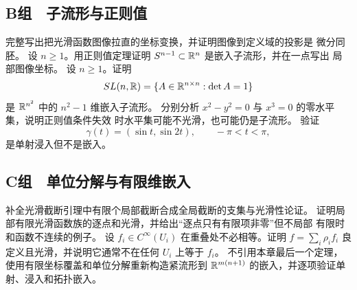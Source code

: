 \subsection*{B组　子流形与正则值}
\begin{enumerate}[label=\textbf{\thechapter.\arabic*.},resume]
 完整写出把光滑函数图像拉直的坐标变换，并证明图像到定义域的投影是
 微分同胚。
 设 $n\ge1$。用正则值定理证明 \(S^{n-1}\subset\mathbb{R}^n\) 是嵌入子流形，并在一点写出
 局部图像坐标。
 设 \(n\ge1\)。证明
 \[
 SL(n,\mathbb{R})=\{A\in\mathbb{R}^{n\times n}:\det A=1\}
 \]
 是 \(\mathbb{R}^{n^2}\) 中的 \(n^2-1\) 维嵌入子流形。
 分别分析 \(x^2-y^2=0\) 与 \(x^3=0\) 的零水平集，说明正则值条件失效
 时水平集可能不光滑，也可能仍是子流形。
 验证
 \[
 \gamma(t)=(\sin t,\sin 2t),\qquad -\pi<t<\pi,
 \]
 是单射浸入但不是嵌入。
\end{enumerate}

\subsection*{C组　单位分解与有限维嵌入}
\begin{enumerate}[label=\textbf{\thechapter.\arabic*.},resume]
 补全光滑截断引理中有限个局部截断合成全局截断的支集与光滑性论证。
 证明局部有限光滑函数族的逐点和光滑，并给出“逐点只有有限项非零”但不局部
 有限时和函数不连续的例子。
 设 \(f_i\in C^\infty(U_i)\) 在重叠处不必相等。证明
 \(f=\sum_i\rho_i f_i\) 良定义且光滑，并说明它通常不在任何 \(U_i\)
 上等于 \(f_i\)。
 不引用本章最后一个定理，使用有限坐标覆盖和单位分解重新构造紧流形到
 \(\mathbb{R}^{m(n+1)}\) 的嵌入，并逐项验证单射、浸入和拓扑嵌入。
\end{enumerate}
